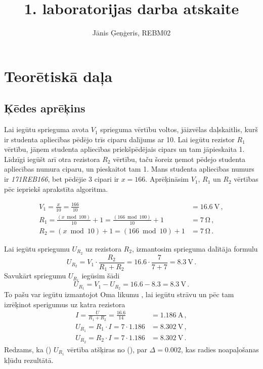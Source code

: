 \documentclass[12pt,table]{report}
\title{1. laboratorijas darba atskaite}
\author{Jānis Ģeņģeris, REBM02}
\begin{document}
\maketitle

\chapter{Teorētiskā daļa}
\section{Ķēdes aprēķins}
Lai iegūtu sprieguma avota $V_1$ sprieguma vērtību voltos, jāizvēlas daļskaitlis,
kurš ir studenta apliecības pēdējo trīs ciparu dalījums ar 10. Lai iegūtu rezistor
$R_1$ vērtību, jāņem studenta apliecības priekšpēdējais cipars un tam jāpieskaita 1.
Līdzīgi iegūšt arī otra rezistora $R_2$ vērtību, taču šoreiz ņemot pēdejo studenta
apliecības numura ciparu, un pieskaitot tam 1. Mans studenta apliecības numurs ir
\emph{171REB166}, bet pēdējie 3 cipari ir $x=166$. Aprēķināsim $V_1$, $R_1$ un $R_2$
vērtības pēc iepriekš aprakstīta algoritma.

\begin{align}
V_1 = \frac{x}{10} = \frac{166}{10} &= \SI{16.6}{\volt}\,,\\
R_1 = \frac{\left(x \bmod 100\right)}{10} + 1
	= \frac{\left(166 \bmod 100\right)}{10} + 1 &= \SI{7}{\ohm}\,,\\
R_2 = \left(x \bmod 10\right) + 1 = \left(166 \bmod 10\right) + 1 &= \SI{7}{\ohm}\,.
\end{align}

Lai iegūtu spriegumu $U_{R_2}$ uz rezistora $R_2$, izmantosim
sprieguma dalītāja formulu \cite[43.lpp]{calexander2012}
\begin{equation}
U_{R_2} = V_1\cdot\frac{R_2}{R_1 + R_2} = 16.6\cdot \frac{7}{7 + 7} = \SI{8.3}{\volt}\,.
\end{equation}
Savukārt spriegumu $U_{R_1}$ iegūsim šādi
\begin{equation}
\label{eq:res_1}
U_{R_1} = V_1 - U_{R_2} = 16.6 - 8.3 = \SI{8.3}{\volt}\,.
\end{equation}
To pašu var iegūtu izmantojot Oma likumu \cite[30.lpp]{calexander2012}, lai iegūtu strāvu un pēc tam izrēķinot
sperigumus uz katra rezistora
\begin{equation}
\label{eq:res_2}
\begin{aligned}
I = \frac{U}{R_1 + R_2} = \frac{16.6}{14} &= \SI{1.186}{\ampere}\,,\\
U_{R_1} = R_1 \cdot I = 7 \cdot 1.186 &= \SI{8.302}{\volt}\,,\\
U_{R_2} = R_2 \cdot I = 7 \cdot 1.186 &= \SI{8.302}{\volt}\,.
\end{aligned}
\end{equation}
Redzams, ka () $U_{R_1}$ vērtība atšķiras no (), par $\Delta=0.002$, kas
radies noapaļošanas kļūdu rezultātā.
\end{document}
